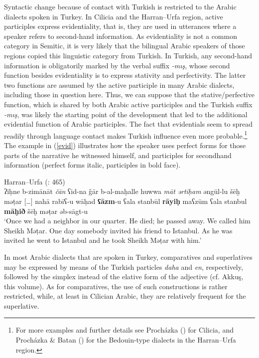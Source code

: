 \documentclass[output=paper]{langsci/langscibook}
\begin{document}
Syntactic change because of contact with Turkish is restricted to the Arabic dialects spoken in Turkey. In Cilicia and the Harran--Urfa region, active participles express evidentiality, that is, they are used in utterances where a speaker refers to second-hand information. As evidentiality is not a common category in Semitic, it is very likely that the bilingual Arabic speakers of those regions copied this linguistic category from Turkish. In Turkish, any second-hand information is obligatorily marked by the verbal suffix \textit{-mış}, whose second function besides evidentiality is to express stativity and perfectivity. The latter two functions are assumed by the active participle in many Arabic dialects, including those in question here. Thus, we can suppose that the stative/perfective function, which is shared by both Arabic active participles and the Turkish suffix \textit{-mış}, was likely the starting point of the development that led to the additional evidential function of Arabic participles. The fact that evidentials seem to spread readily through language contact \citep[10]{Aikhenvald2004} makes Turkish influence even more probable.\footnote{For more examples and further details see Procházka (\citeyear[200--201]{Procházka2002Cukurova}) for Cilicia, and Procházka \& Batan (\citeyear[464--465]{ProcházkaBatan2016}) for the Bedouin-type dialects in the Harran--Urfa region.} The example in (\ref{evid}) illustrates how the speaker uses perfect forms for those parts of the narrative he witnessed himself, and participles for secondhand information (perfect forms italic, participles in bold face). 

\ea \label{evid}
{Harran--Urfa (\citealt{ProcházkaBatan2016}: 465)}\\
  ʔiḥne b-zimānāt \textit{čān} ʕid-na ǧār b-al-maḥalle huwwa \textit{māt} \textit{ərtiḥam} əngūl-lu šēḫ mǝṭar […] nahā{\R} rabīʕ-u wāḥad  \textbf{ʕāzm}{}-u ʕala stanbūl \textbf{rāyiḥ} maʕzūm ʕala stanbul \textbf{māḫið} šēḫ mǝṭar əb-sāgt-u\\

\glt ‘Once we had a neighbor in our quarter. He died; he passed away. We called him Sheikh Mǝṭar. One day somebody invited his friend to Istanbul. As he was invited he went to Istanbul and he took Sheikh Mǝṭar with him.’
\z

In most Arabic dialects that are spoken in Turkey, comparatives and superlatives may be expressed by means of the Turkish particles \textit{daha} and \textit{en}, respectively, followed by the simplex instead of the elative form of the adjective (cf. Akkuş, this volume). As for comparatives, the use of such constructions is rather restricted, while, at least in Cilician Arabic, they are relatively frequent for the superlative. 
\end{document}
